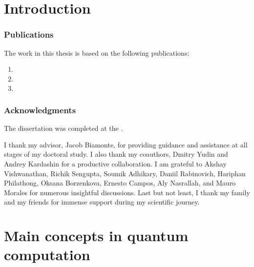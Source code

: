 

\chapter*{Introduction}




\subsection*{Publications}
The work in this thesis is based on the following publications:

\begin{enumerate}
    \item {}
    \item {}
    \item {}
\end{enumerate}

\subsection*{Acknowledgments} 
The dissertation was completed at the {\thesisOrganizationEn}.

I thank my advisor, Jacob Biamonte, for providing guidance and assistance at all stages of my doctoral study. I also thank my coauthors, Dmitry Yudin and Andrey Kardashin for a productive collaboration. I am grateful to Akshay Vishwanathan, Richik Sengupta, Soumik Adhikary, Daniil Rabinovich, Hariphan Philathong, Oksana Borzenkova, Ernesto Campos, Aly Nasrallah, and Mauro Morales for numerous insightful discussions. Last but not least, I thank my family and my friends for immense support during my scientific journey.

\chapter{Main concepts in quantum computation}
\label{chap:quantum_basics}

